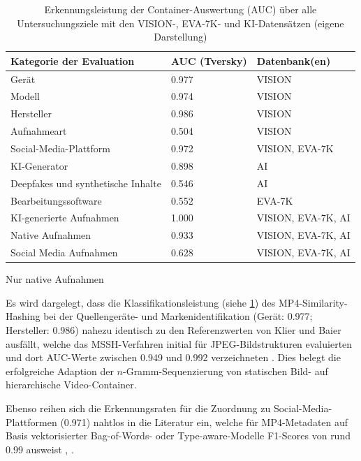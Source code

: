 \begin{table}[h]
    \centering
    \begin{threeparttable}
        \begin{tabular}{lll}\toprule
             \textbf{Kategorie der Evaluation}&  \textbf{AUC} (Tversky)& \textbf{Datenbank(en)}\\\midrule
     Gerät& 0.977&VISION\tnote{*}\\
             Modell&  0.974& VISION\tnote{*}\\
             Hersteller&  0.986& VISION\tnote{*}\\
     Aufnahmeart& 0.504&VISION\tnote{*}\\
     Social-Media-Plattform& 0.972&VISION, EVA-7K\\
     KI-Generator& 0.898&AI\\
     Deepfakes und synthetische Inhalte& 0.546&AI\\ 
     Bearbeitungssoftware& 0.552&EVA-7K\\ 
     KI-generierte Aufnahmen& 1.000&VISION, EVA-7K, AI\\
     Native Aufnahmen& 0.933&VISION, EVA-7K, AI\\ 
     Social Media Aufnahmen& 0.628&VISION, EVA-7K, AI\\ \bottomrule
        \end{tabular}
            \begin{tablenotes}\scriptsize
            \item[*] Nur native Aufnahmen
        \end{tablenotes}
        \caption{Erkennungsleistung der Container-Auswertung (AUC) über alle Untersuchungsziele mit den VISION-\cite{shullani_vision_2017}, EVA-7K-\cite{yang_efficient_2020} und KI-Datensätzen (eigene Darstellung)}
        \label{tab:auc}
    \end{threeparttable}
\end{table}

Es wird dargelegt, dass die Klassifikationsleistung (siehe \cref{tab:auc}) des MP4-Similarity-Hashing bei der Quellengeräte- und Markenidentifikation (Gerät: 0.977; Hersteller: 0.986) nahezu identisch zu den Referenzwerten von Klier und Baier ausfällt, welche das MSSH-Verfahren initial für JPEG-Bildstrukturen evaluierten und dort AUC-Werte zwischen 0.949 und 0.992 verzeichneten \cite[Tab. 3]{klier_media_2025}. Dies belegt die erfolgreiche Adaption der \(n\)-Gramm-Sequenzierung von statischen Bild- auf hierarchische Video-Container.

Ebenso reihen sich die Erkennungsraten für die Zuordnung zu Social-Media-Plattformen (0.971) nahtlos in die Literatur ein, welche für MP4-Metadaten auf Basis vektorisierter Bag-of-Words- oder Type-aware-Modelle F1-Scores von rund 0.99 ausweist \cite[Kap. 5]{xiang_forensic_2021}, \cite[Kap. 4]{yang_efficient_2020}.

